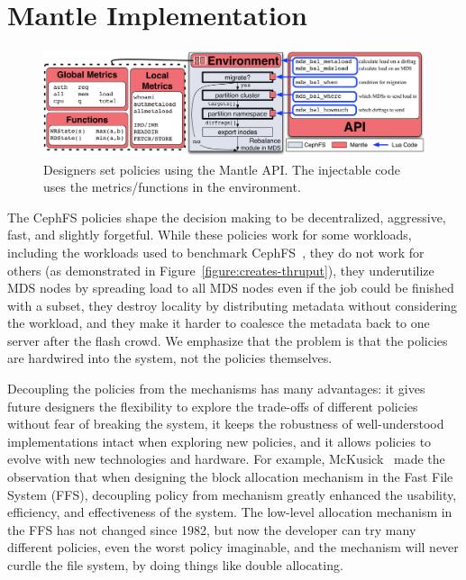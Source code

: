 \section{Mantle Implementation} 						%
\label{mantle-implementation}							%
\begin{figure}
	\centering
	\includegraphics[width=1\textwidth]{./chapters/mantle/figures/balancer-api.pdf} 
	\caption{Designers set policies using the Mantle API. The injectable code uses the metrics/functions in the environment. \label{figure:balancer-api}}  
\end{figure}

The CephFS policies shape the decision making to be decentralized, aggressive, fast, and slightly forgetful. While these policies work for some workloads, including the workloads used to benchmark CephFS~\cite{weil:sc2004-dyn-metadata}, they do not work for others (as demonstrated in Figure~\ref{figure:creates-thruput}), they underutilize MDS nodes by spreading load to all MDS nodes even if the job could be finished with a subset, they destroy locality by distributing metadata without considering the workload, and they make it harder to coalesce the metadata back to one server after the flash crowd. We emphasize that the problem is that the policies are hardwired into the system, not the policies themselves. 

Decoupling the policies from the mechanisms has many advantages: it gives future designers the flexibility to explore the trade-offs of different policies without fear of breaking the system, it keeps the robustness of well-understood implementations intact when exploring new policies, and it allows policies to evolve with new technologies and hardware. For example, McKusick~\cite{mckusick:fast2015-FFS} made the observation that when designing the block allocation mechanism in the Fast File System (FFS), decoupling policy from mechanism greatly enhanced the usability, efficiency, and effectiveness of the system. The low-level allocation mechanism in the FFS has not changed since 1982, but now the developer can try many different policies, even the worst policy imaginable, and the mechanism will never curdle the file system, by doing things like double allocating. 

